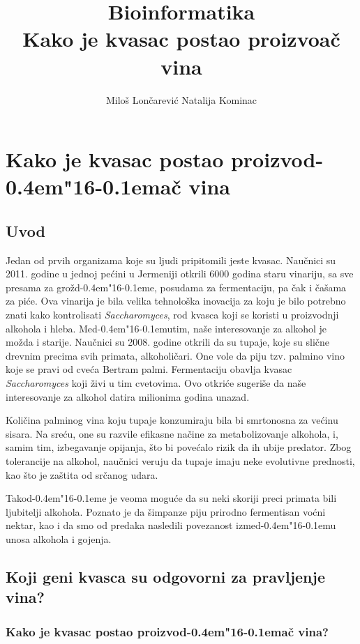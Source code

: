 \documentclass[a4paper]{book}
\title{Bioinformatika \\ Kako je kvasac postao proizvo\dj ač vina}
\author{Miloš Lončarević Natalija Kominac }
\def \dj {d\kern-0.4em\char"16\kern-0.1em}
\begin{document}
\maketitle
\chapter{Kako je kvasac postao proizvo\dj ač vina}

\setbookcodestyle
\section{Uvod}

Jedan od prvih organizama koje su ljudi pripitomili jeste kvasac. Naučnici su 2011. godine u jednoj pećini u Jermeniji otkrili 6000 godina staru vinariju, sa sve presama za gro\v z\dj e, posudama za fermentaciju, pa čak i čašama za piće. Ova vinarija je bila velika tehnološka inovacija za koju je bilo potrebno znati kako kontrolisati \textit{Saccharomyces}, rod kvasca koji se koristi u proizvodnji alkohola i hleba. Me\dj utim, naše interesovanje za alkohol je možda i starije. Naučnici su 2008. godine otkrili da su tupaje, koje su slične drevnim precima svih primata, alkoholičari.  One vole da piju tzv. palmino vino koje se pravi od cveća Bertram palmi. Fermentaciju obavlja kvasac \textit{Saccharomyces} koji živi u tim cvetovima. Ovo otkriće sugeriše da naše interesovanje za alkohol datira milionima godina unazad.

Količina palminog vina koju tupaje konzumiraju bila bi smrtonosna za većinu sisara. Na sreću, one su razvile efikasne načine za metabolizovanje alkohola, i, samim tim, izbegavanje opijanja, što bi povećalo rizik da ih ubije predator.
Zbog tolerancije na alkohol, naučnici veruju da tupaje imaju neke evolutivne prednosti, kao što je zaštita od srčanog udara.

Tako\dj e je veoma moguće da su neki skoriji preci primata bili ljubitelji alkohola. Poznato je da šimpanze piju prirodno fermentisan voćni nektar, kao i da smo od predaka nasledili povezanost izme\dj u unosa alkohola i gojenja. 

\section{Koji geni kvasca su odgovorni za pravljenje vina?}
\subsection{Kako je kvasac postao proizvo\dj ač vina?}
\end{document}
